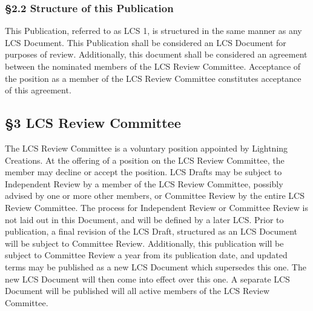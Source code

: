 \hypertarget{structure-of-this-publication}{%
\subsubsection{§2.2 Structure of this
Publication}\label{structure-of-this-publication}}

This Publication, referred to as LCS 1, is structured in the same manner
as any LCS Document. This Publication shall be considered an LCS
Document for purposes of review. Additionally, this document shall be
considered an agreement between the nominated members of the LCS Review
Committee. Acceptance of the position as a member of the LCS Review
Committee constitutes acceptance of this agreement.

\hypertarget{lcs-review-committee}{%
\subsection{§3 LCS Review Committee}\label{lcs-review-committee}}

The LCS Review Committee is a voluntary position appointed by Lightning
Creations. At the offering of a position on the LCS Review Committee,
the member may decline or accept the position. LCS Drafts may be subject
to Independent Review by a member of the LCS Review Committee, possibly
advised by one or more other members, or Committee Review by the entire
LCS Review Committee. The process for Independent Review or Committee
Review is not laid out in this Document, and will be defined by a later
LCS. Prior to publication, a final revision of the LCS Draft, structured
as an LCS Document will be subject to Committee Review. Additionally,
this publication will be subject to Committee Review a year from its
publication date, and updated terms may be published as a new LCS
Document which supersedes this one. The new LCS Document will then come
into effect over this one. A separate LCS Document will be published
will all active members of the LCS Review Committee.
